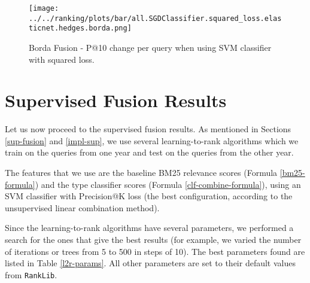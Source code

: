\begin{figure}
\centerline{
  \texttt{[image: ../../ranking/plots/bar/all.SGDClassifier.squared\_loss.elasticnet.hedges.borda.png]}
  }
  \caption{Borda Fusion - P@10 change per query when using SVM classifier with squared loss.}
  \label{borda-query}
\end{figure}


\section{Supervised Fusion Results}
Let us now proceed to the supervised fusion results. As mentioned in Sections \ref{sup-fusion} and \ref{impl-sup}, we use several
learning-to-rank algorithms which we train on the queries from one year and test on the queries from the other year.

The features that we use are the baseline BM25 relevance scores (Formula \ref{bm25-formula}) and the type classifier scores
(Formula \ref{clf-combine-formula}), using an SVM
classifier with Precision@K loss (the best configuration, according to the unsupervised linear combination method).

Since the learning-to-rank algorithms have several parameters, we performed a search for the ones that give the best
results (for example, we varied the number of iterations or trees from 5 to 500 in steps of 10).
The best parameters found are listed in Table \ref{l2r-params}. All other parameters are set to their default values from \texttt{RankLib}.

\begin{table}[h!]
\centering
\caption{Best parameters found for the learning-to-rank algorithms.}
\label{l2r-params}
\end{table}

